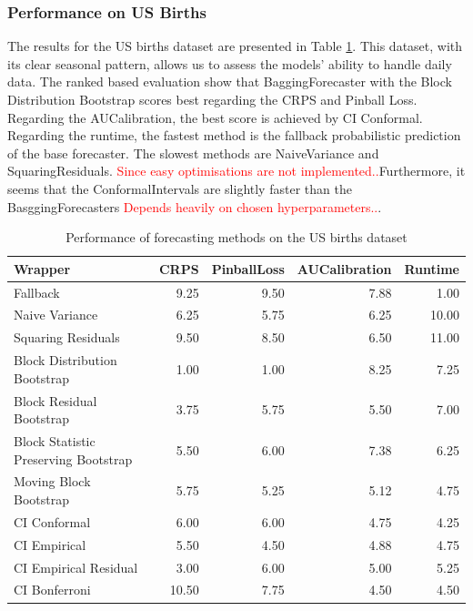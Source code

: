 \subsubsection{Performance on US Births}
The results for the US births dataset are presented in Table \ref{table:us_births_results}. This dataset, with its clear seasonal pattern, allows us to assess the models' ability to handle daily data.
The ranked based evaluation show that BaggingForecaster with the Block Distribution Bootstrap scores best regarding the CRPS and Pinball Loss. 
Regarding the AUCalibration, the best score is achieved by CI Conformal. Regarding the runtime, the fastest method is the fallback probabilistic prediction of the base forecaster. The slowest methods are NaiveVariance and SquaringResiduals. 
\textcolor{red}{Since easy optimisations are not implemented..}Furthermore, it seems that the ConformalIntervals are slightly faster than the BasggingForecasters \textcolor{red}{Depends heavily on chosen hyperparameters..}. 

\begin{table}[h]
    \centering
    \caption{Performance of forecasting methods on the US births dataset}
    \label{table:us_births_results}
\begin{tabular}{lrrrr}
\toprule
Wrapper & CRPS & PinballLoss & AUCalibration & Runtime \\
\midrule
Fallback & 9.25 & 9.50 & 7.88 & 1.00 \\
Naive Variance & 6.25 & 5.75 & 6.25 & 10.00 \\
Squaring Residuals & 9.50 & 8.50 & 6.50 & 11.00 \\
Block Distribution Bootstrap & 1.00 & 1.00 & 8.25 & 7.25 \\
Block Residual Bootstrap & 3.75 & 5.75 & 5.50 & 7.00 \\
Block Statistic Preserving Bootstrap & 5.50 & 6.00 & 7.38 & 6.25 \\
Moving Block Bootstrap & 5.75 & 5.25 & 5.12 & 4.75 \\
CI Conformal & 6.00 & 6.00 & 4.75 & 4.25 \\
CI Empirical & 5.50 & 4.50 & 4.88 & 4.75 \\
CI Empirical Residual & 3.00 & 6.00 & 5.00 & 5.25 \\
CI Bonferroni  & 10.50 & 7.75 & 4.50 & 4.50 \\
\bottomrule
\end{tabular}

\end{table}


